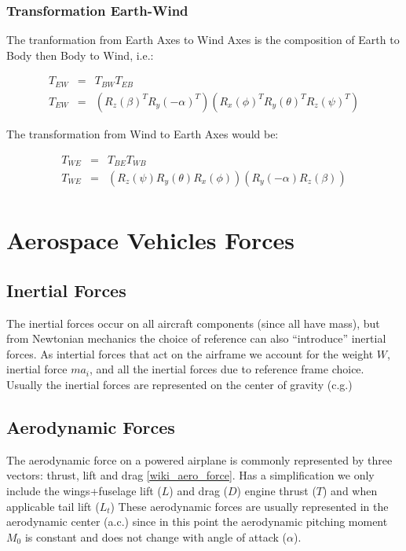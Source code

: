 \subsubsection{Transformation Earth-Wind}
The tranformation from Earth Axes to Wind Axes is the composition of Earth to Body
then Body to Wind, i.e.:

\begin{eqnarray}
    T_{EW} &=& T_{BW}T_{EB}\\
    T_{EW} &=& (R_z(\beta)^T R_y(-\alpha)^T) (R_x(\phi)^T R_y(\theta)^T  R_z(\psi)^T)
\end{eqnarray}

The transformation from Wind to Earth Axes would be:

\begin{eqnarray}
    T_{WE} &=& T_{BE}T_{WB}\\
    T_{WE} &=& (R_z(\psi) R_y(\theta) R_x(\phi)) (R_y(-\alpha) R_z(\beta)) \\
\end{eqnarray}


\newpage
\section{Aerospace Vehicles Forces}
\subsection{Inertial Forces}
The inertial forces occur on all aircraft components (since all have mass), but from Newtonian mechanics the choice of reference can also
``introduce'' inertial forces. As intertial forces that act on the airframe we account for the weight $W$, inertial force $m a_i$, and all the
inertial forces due to reference frame choice. Usually the inertial forces are represented on the center of gravity (c.g.)

\subsection{Aerodynamic Forces}
The aerodynamic force on a powered airplane is commonly represented by three vectors: thrust, lift and drag \ref{wiki_aero_force}.
Has a simplification we only include the wings+fuselage lift ($L$) and drag ($D$) engine thrust ($T$) and when applicable tail lift ($L_t$)
These aerodynamic forces are usually represented in the aerodynamic center (a.c.) since in this point the aerodynamic pitching moment $M_0$ is constant
and does not change with angle of attack ($\alpha$).


